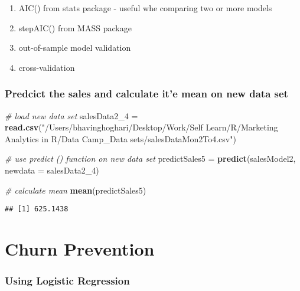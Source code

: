\documentclass[
]{article}
\newenvironment{Shaded}{\begin{snugshade}}{\end{snugshade}}
\newcommand{\CommentTok}[1]{\textcolor[rgb]{0.56,0.35,0.01}{\textit{#1}}}
\newcommand{\DataTypeTok}[1]{\textcolor[rgb]{0.13,0.29,0.53}{#1}}
\newcommand{\DecValTok}[1]{\textcolor[rgb]{0.00,0.00,0.81}{#1}}
\newcommand{\KeywordTok}[1]{\textcolor[rgb]{0.13,0.29,0.53}{\textbf{#1}}}
\newcommand{\NormalTok}[1]{#1}
\newcommand{\StringTok}[1]{\textcolor[rgb]{0.31,0.60,0.02}{#1}}
\providecommand{\tightlist}{%
  \setlength{\itemsep}{0pt}\setlength{\parskip}{0pt}}
\begin{document}
\begin{enumerate}
\def\labelenumi{\arabic{enumi}.}
\tightlist
\item
  AIC() from stats package - useful whe comparing two or more models
\item
  stepAIC() from MASS package
\item
  out-of-sample model validation
\item
  cross-validation
\end{enumerate}

\hypertarget{predcict-the-sales-and-calculate-ite-mean-on-new-data-set}{%
\subsubsection{Predcict the sales and calculate it'e mean on new data
set}\label{predcict-the-sales-and-calculate-ite-mean-on-new-data-set}}

\begin{Shaded}
\begin{Highlighting}[]
\CommentTok{# load new data set}
\NormalTok{salesData2_}\DecValTok{4}\NormalTok{ =}\StringTok{ }\KeywordTok{read.csv}\NormalTok{(}\StringTok{"/Users/bhavinghoghari/Desktop/Work/Self Learn/R/Marketing Analytics in R/Data Camp_Data sets/salesDataMon2To4.csv"}\NormalTok{)}

\CommentTok{# use predict () function on new data set}
\NormalTok{predictSales5 =}\StringTok{ }\KeywordTok{predict}\NormalTok{(salesModel2, }\DataTypeTok{newdata =}\NormalTok{ salesData2_}\DecValTok{4}\NormalTok{)}

\CommentTok{# calculate mean}
\KeywordTok{mean}\NormalTok{(predictSales5)}
\end{Highlighting}
\end{Shaded}

\begin{verbatim}
## [1] 625.1438
\end{verbatim}

\hypertarget{churn-prevention}{%
\section{Churn Prevention}\label{churn-prevention}}

\hypertarget{using-logistic-regression}{%
\subsubsection{Using Logistic
Regression}\label{using-logistic-regression}}
\end{document}

